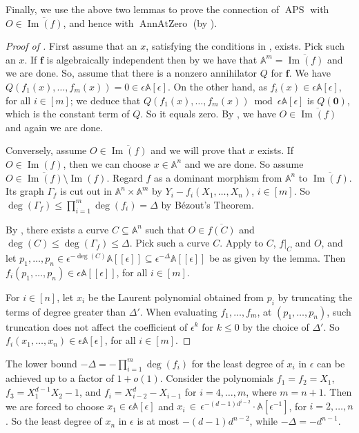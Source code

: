 \documentclass{toc}
\newcommand{\aff}{\mathbb{A}}
\DeclareMathOperator{\im}{\mathrm{Im}}
\DeclareMathOperator{\APS}{\mathrm{APS}\xspace} %
\DeclareMathOperator{\AnnAtZero}{\mathrm{AnnAtZero}\xspace} %
\begin{document}
Finally, we use the above two lemmas to prove the connection of $\APS$ with $O\in \overline{\im(f)}$, and hence with $\AnnAtZero$ (by ).

\begin{proof}[Proof of ]
First assume that an $x$, satisfying the conditions in , exists. Pick such an $x$. If $\mathbf f$
%
is  %
algebraically independent then by  we have that $\aff^m=\overline{\im(f)}$ and we are done. So, assume that there is a nonzero annihilator $Q$ for $\mathbf f$.
We have $Q(f_1(x),\dots,f_m(x))=0\in\epsilon \aff[\epsilon]$. On the other hand, as $f_i(x)\in \epsilon \aff[\epsilon]$, for all $i\in [m]$; we deduce that $Q(f_1(x),\dots,f_m(x))\bmod \epsilon \aff[\epsilon]$ is $Q(\mathbf 0)$, which is the constant term of $Q$. So it equals zero. By , we have $O\in \overline{\im(f)}$ and again we are done.

Conversely, assume $O\in \overline{\im(f)}$ and we will prove that $x$ exists.
If $O\in \im(f)$, then we can choose $x\in \aff^n$ and we are done. So assume $O\in  \overline{\im(f)}\setminus \im(f)$.
Regard $f$ as a dominant morphism from $\aff^n$ to $\overline{\im(f)}$. Its graph $\Gamma_f$ is cut out in $\aff^n\times \aff^m$ by $Y_i-f_i(X_1,\dots,X_n)$, $i\in[m]$. So $\deg(\Gamma_f)\leq \prod_{i=1}^m \deg(f_i) = \Delta$ by B\'ezout's Theorem.

By , there exists a curve $C\subseteq \aff^n$ such that $O\in \overline{f(C)}$ and $\deg(C)\leq \deg(\Gamma_f)\leq \Delta$. Pick such a curve $C$. Apply  to $C$, $f|_C$ and $O$, and let $p_1,\dots,p_n\in \epsilon^{-\deg(C)} \aff[[\epsilon]]\subseteq \epsilon^{-\Delta} \aff[[\epsilon]]$ be as given by the lemma.
Then $f_i(p_1,\dots,p_n)\in \epsilon \aff[[\epsilon]]$, for all $i\in [m]$. 

For $i\in [n]$, let $x_i$ be the Laurent polynomial obtained from $p_i$ by truncating the terms of degree greater than $\Delta'$.
When evaluating $f_1,\dots,f_m$, at $(p_1,\dots,p_n)$, such truncation does not affect the coefficient of $\epsilon^k$ for $k\leq 0$ by the choice of $\Delta'$.
So $f_i(x_1,\dots,x_n)\in \epsilon \aff[\epsilon]$,  for all $i\in [m]$.
\end{proof}

\noindent

%
\begin{remark}   %
The lower bound $-\Delta=-\prod_{i=1}^m \deg(f_i)$ for the least degree of $x_i$ in $\epsilon$ can be achieved up to a  factor of $1+o(1)$. Consider the polynomials $f_1=f_2=X_1$, $f_3=X_1^{d-1}X_2-1$, and $f_i=X_{i-2}^d-X_{i-1}$ for $i=4,\dots,m$, where $m=n+1$. Then we are forced to choose $x_1\in  \epsilon \aff[\epsilon]$ and $x_i \,\in\, \epsilon^{-(d-1)d^{i-2}}\cdot\aff[\epsilon^{-1}] $, for $i=2,\dots, n$. So the least degree of $x_n$ in $\epsilon$  is at most $-(d-1)d^{n-2}$, while $-\Delta=-d^{n-1}$.
\end{remark}
\end{document}
